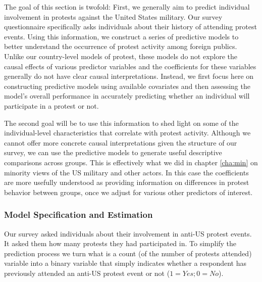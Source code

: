The goal of this section  is twofold: First, we generally aim to predict individual involvement in protests against the United States military. Our survey questionnaire specifically asks individuals about their history of attending protest events. Using this information, we construct a series of predictive models to better understand the occurrence of protest activity among foreign publics. Unlike our country-level models of protest, these models do not explore the causal effects of various predictor variables and the coefficients for these variables generally do not have clear causal interpretations. Instead, we first focus here on constructing predictive models using available covariates and then assessing the model's overall performance in accurately predicting whether an individual will participate in a protest or not. 

The second goal will be to use this information to shed light on some of the individual-level characteristics that correlate with protest activity. Although we cannot offer more concrete causal interpretations given the structure of our survey, we can use the predictive models to generate useful descriptive comparisons across groups. This is effectively what we did in chapter \ref{cha:min} on minority views of the US military and other actors. In this case the coefficients are more usefully understood as providing information on differences in protest behavior between groups, once we adjust for various other predictors of interest.

\subsubsection*{Model Specification and Estimation}


Our survey asked individuals about their involvement in anti-US protest events. It asked them how many protests they had participated in. To simplify the prediction process we turn what is a count (of the number of protests attended) variable into a binary variable that simply indicates whether a respondent has previously attended an anti-US protest event or not ($1 = Yes; 0 = No$). 

